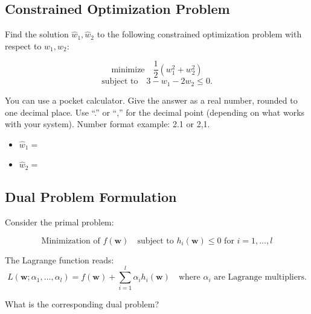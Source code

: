 \documentclass{article}
\begin{document}
\subsection*{Constrained Optimization Problem}

Find the solution \(\hat{w}_1, \hat{w}_2\) to the following constrained optimization problem with respect to \(w_1, w_2\):

\[
\text{minimize} \quad \frac{1}{2}(w_1^2 + w_2^2)
\]
\[
\text{subject to} \quad 3 - w_1 - 2w_2 \leq 0.
\]

You can use a pocket calculator. Give the answer as a real number, rounded to one decimal place. Use ``.'' or ``,'' for the decimal point (depending on what works with your system). Number format example: 2.1 or 2,1.

\begin{itemize}
    \item \(\hat{w}_1 = \)
    \item \(\hat{w}_2 = \)
\end{itemize}

\subsection*{Dual Problem Formulation}

Consider the primal problem:

\[
\text{Minimization of } f(\mathbf{w}) \quad \text{subject to } h_i(\mathbf{w}) \leq 0 \text{ for } i = 1, \ldots, l
\]

The Lagrange function reads:
\[
L(\mathbf{w}; \alpha_1, \ldots, \alpha_l) = f(\mathbf{w}) + \sum_{i=1}^l \alpha_i h_i(\mathbf{w}) \quad \text{where } \alpha_i \text{ are Lagrange multipliers.}
\]

What is the corresponding dual problem?
\end{document}
